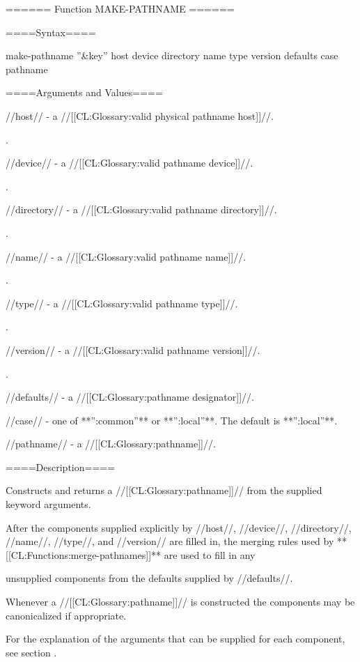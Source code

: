 ====== Function MAKE-PATHNAME ======

====Syntax====

\DefunWithValuesNewline make-pathname {''&key'' host device directory name type version defaults case} {pathname}

====Arguments and Values====

//host// - a //[[CL:Glossary:valid physical pathname host]]//.

\HairyDefault.

//device// - a //[[CL:Glossary:valid pathname device]]//.

\HairyDefault.

//directory// - a //[[CL:Glossary:valid pathname directory]]//.

\HairyDefault.

//name// - a //[[CL:Glossary:valid pathname name]]//.

\HairyDefault.

//type// - a //[[CL:Glossary:valid pathname type]]//.

\HairyDefault.

//version// - a //[[CL:Glossary:valid pathname version]]//.

\HairyDefault.

//defaults// - a //[[CL:Glossary:pathname designator]]//. 

//case// - one of **'':common''** or **'':local''**. The default is **'':local''**.

//pathname// - a //[[CL:Glossary:pathname]]//.

====Description====

Constructs and returns a //[[CL:Glossary:pathname]]// from the supplied keyword arguments.

After the components supplied explicitly by //host//, //device//, //directory//, //name//, //type//, and //version// are filled in, the merging rules used by **[[CL:Functions:merge-pathnames]]** are used to fill in any

unsupplied components from the defaults supplied by //defaults//.

Whenever a //[[CL:Glossary:pathname]]// is constructed the components may be canonicalized if appropriate.

For the explanation of the arguments that can be supplied for each component, see section {\secref\PathnameComponents}.

